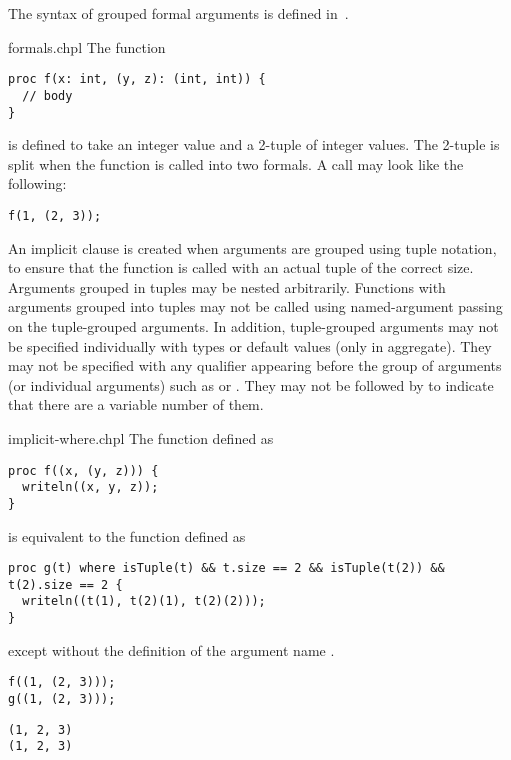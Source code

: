 The syntax of grouped formal arguments is defined
in~.

\begin{chapelexample}{formals.chpl}
The function
\begin{chapel}
\begin{verbatim}
proc f(x: int, (y, z): (int, int)) {
  // body
}
\end{verbatim}
\end{chapel}
is defined to take an integer value and a 2-tuple of integer values.
The 2-tuple is split when the function is called into two formals.  A
call may look like the following:
\begin{chapel}
\begin{verbatim}
f(1, (2, 3));
\end{verbatim}
\end{chapel}
\end{chapelexample}

An implicit  clause is created when arguments are grouped using
tuple notation, to ensure that the function is called with an actual
tuple of the correct size.  Arguments grouped in tuples may be
nested arbitrarily.  Functions with arguments grouped into tuples may not be
called using named-argument passing on the tuple-grouped arguments.
In addition, tuple-grouped arguments may not be specified individually
with types or default values (only in aggregate).  They may not be
specified with any qualifier appearing before the group of arguments
(or individual arguments) such as  or .  They
may not be followed by  to indicate that there are a
variable number of them.

\begin{chapelexample}{implicit-where.chpl}
The function  defined as
\begin{chapel}
\begin{verbatim}
proc f((x, (y, z))) {
  writeln((x, y, z));
}
\end{verbatim}
\end{chapel}
is equivalent to the function  defined as
\begin{chapel}
\begin{verbatim}
proc g(t) where isTuple(t) && t.size == 2 && isTuple(t(2)) && t(2).size == 2 {
  writeln((t(1), t(2)(1), t(2)(2)));
}
\end{verbatim}
\end{chapel}
except without the definition of the argument name .
\begin{chapelpost}
\begin{verbatim}
f((1, (2, 3)));
g((1, (2, 3)));
\end{verbatim}
\end{chapelpost}
\begin{chapeloutput}
\begin{verbatim}
(1, 2, 3)
(1, 2, 3)
\end{verbatim}
\end{chapeloutput}
\end{chapelexample}


